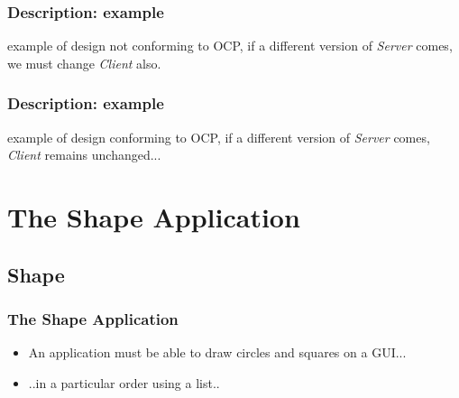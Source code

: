 \documentclass{beamer}
\begin{document}
\begin{frame}
  \frametitle{Description: example}
    example of design not conforming to OCP, if a different version of \textit{Server} comes, we must change \textit{Client} also. \\
    \bigbreak
\end{frame}

\begin{frame}
  \frametitle{Description: example}
    example of design conforming to OCP, if a different version of \textit{Server} comes, \textit{Client} remains unchanged... \\
    \bigbreak
\end{frame}

\section{The Shape Application}
\subsection{Shape}
\begin{frame}
  \frametitle{The Shape Application}
  \begin{itemize}
	\item<+-> An application must be able to draw circles and squares on a GUI...
	\item<+-> ..in a particular order using a list..
   \end{itemize}
\end{frame}
\end{document}
